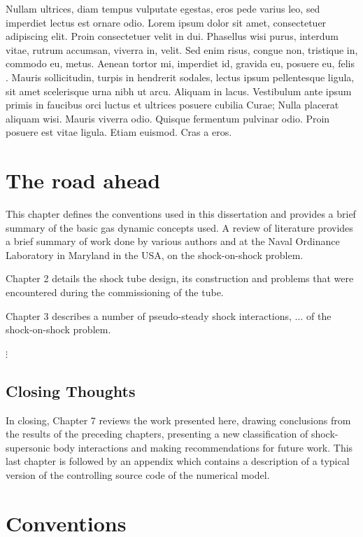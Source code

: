 Nullam ultrices, diam tempus vulputate egestas, eros pede varius leo, sed imperdiet lectus est ornare odio. Lorem ipsum dolor sit amet, consectetuer adipiscing elit. Proin consectetuer velit in dui. Phasellus wisi purus, interdum vitae, rutrum accumsan, viverra in, velit. Sed enim risus, congue non, tristique in, commodo eu, metus. Aenean tortor mi, imperdiet id, gravida eu, posuere eu, felis \cite{Knuth1968}. Mauris sollicitudin, turpis in hendrerit sodales, lectus ipsum pellentesque ligula, sit amet scelerisque urna nibh ut arcu. Aliquam in lacus. Vestibulum ante ipsum primis in faucibus orci luctus et ultrices posuere cubilia Curae; Nulla placerat aliquam wisi. Mauris viverra odio. Quisque fermentum pulvinar odio. Proin posuere est vitae ligula. Etiam euismod. Cras a eros.

\section{The road ahead}

This chapter defines the conventions used in this dissertation and provides a brief summary of
the basic gas dynamic concepts used. A review of literature provides a brief summary of work
done by various authors and at the Naval Ordinance Laboratory in Maryland in the USA, on the
shock-on-shock problem.

Chapter 2 details the shock tube design, its construction and problems that were encountered
during the commissioning of the tube.

Chapter 3 describes a number of pseudo-steady shock interactions, $\ldots$ of the
shock-on-shock problem.

$\vdots$

\subsection{Closing Thoughts}\label{sec:closingthoughts}

In closing, Chapter 7 reviews the work presented here, drawing conclusions from the results of
the preceding chapters, presenting a new classification of shock-supersonic body interactions
and making recommendations for future work. This last chapter is followed by an appendix
which contains a description of a typical version of the controlling source code of the
numerical model.

\section{Conventions}\label{sec:conventions}

